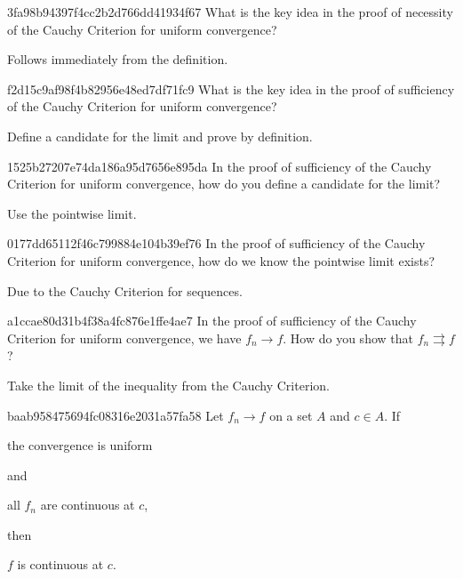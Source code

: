 \begin{note}{3fa98b94397f4cc2b2d766dd41934f67}
    What is the key idea in the proof of necessity of the Cauchy Criterion for uniform convergence?

    \begin{cloze}{1}
        Follows immediately from the definition.
    \end{cloze}
\end{note}

\begin{note}{f2d15c9af98f4b82956e48ed7df71fc9}
    What is the key idea in the proof of sufficiency of the Cauchy Criterion for uniform convergence?

    \begin{cloze}{1}
        Define a candidate for the limit and prove by definition.
    \end{cloze}
\end{note}

\begin{note}{1525b27207e74da186a95d7656e895da}
    In the proof of sufficiency of the Cauchy Criterion for uniform convergence, how do you define a candidate for the limit?

    \begin{cloze}{1}
        Use the pointwise limit.
    \end{cloze}
\end{note}

\begin{note}{0177dd65112f46c799884e104b39ef76}
    In the proof of sufficiency of the Cauchy Criterion for uniform convergence, how do we know the pointwise limit exists?

    \begin{cloze}{1}
        Due to the Cauchy Criterion for sequences.
    \end{cloze}
\end{note}

\begin{note}{a1ccae80d31b4f38a4fc876e1ffe4ae7}
    In the proof of sufficiency of the Cauchy Criterion for uniform convergence, we have \({ f_n \to f }\).
    How do you show that \({ f_n \rightrightarrows f }\)?

    \begin{cloze}{1}
        Take the limit of the inequality from the Cauchy Criterion.
    \end{cloze}
\end{note}

\begin{note}{baab958475694fc08316e2031a57fa58}
    Let \({ f_n \to f }\) on a set \({ A }\) and \({ c \in A }\).
    If \begin{icloze}{3}the convergence is uniform\end{icloze} and \begin{icloze}{2}all \({ f_n }\) are continuous at \({ c }\),\end{icloze} then \begin{icloze}{1}\({ f }\) is continuous at \({ c }\).\end{icloze}
\end{note}

